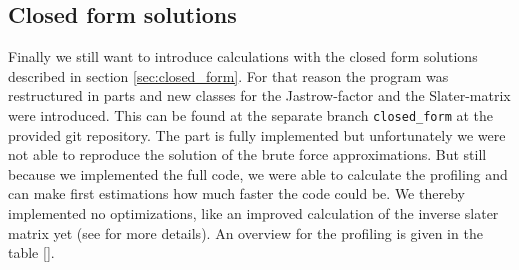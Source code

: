 \subsection{Closed form solutions}\label{sec:analytical}
Finally we still want to introduce calculations with the closed form solutions described in section \ref{sec:closed_form}. For that reason the program was restructured in parts and new classes for the Jastrow-factor and the Slater-matrix were introduced. This can be found at the separate branch \texttt{closed\_form} at the provided git repository. The part is fully implemented but unfortunately we were not able to reproduce the solution of the brute force approximations. But still because we implemented the full code, we were able to calculate the profiling and can make first estimations how much faster the code could be. We thereby implemented no optimizations, like an improved calculation of the inverse slater matrix yet (see \citet{hogberget2013} for more details). An overview for the profiling is given in the table \ref{}.
